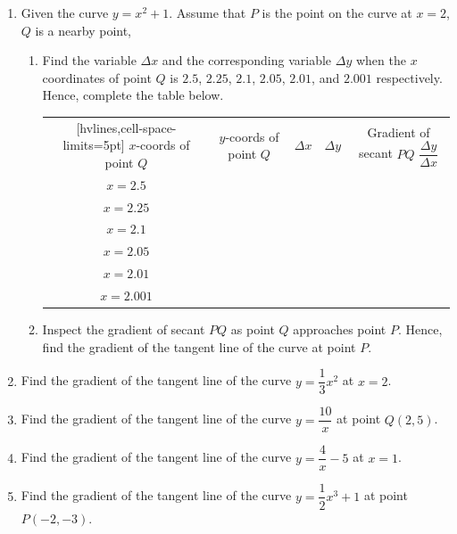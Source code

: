 \documentclass[12pt]{report}
\begin{document}
\begin{enumerate}
  \item Given the curve $y = x^2 + 1$. Assume that $P$ is the point on the curve at $x
          = 2$, $Q$ is a nearby point,
        \begin{enumerate}
          \item Find the variable $\Delta x$ and the corresponding variable $\Delta y$ when the
                $x$ coordinates of point $Q$ is $2.5$, $2.25$, $2.1$, $2.05$, $2.01$, and
                $2.001$ respectively. Hence, complete the table below.
                \begin{center}
                  \begin{NiceTabular}{|c|c|c|c|c|}[hvlines,cell-space-limits=5pt]
                    $x$-coords of point $Q$ & $y$-coords of point $Q$ & $\Delta x$ & $\Delta y$ & Gradient of secant $PQ$ $\dfrac{\Delta y}{\Delta x}$ \\
                    $x = 2.5$                    &                              &            &            &                              \\
                    $x = 2.25$                   &                              &            &            &                              \\
                    $x = 2.1$                    &                              &            &            &                              \\
                    $x = 2.05$                   &                              &            &            &                              \\
                    $x = 2.01$                   &                              &            &            &                              \\
                    $x = 2.001$                  &                              &            &            &                              \\
                  \end{NiceTabular}
                \end{center}

          \item Inspect the gradient of secant $PQ$ as point $Q$ approaches point $P$. Hence,
                find the gradient of the tangent line of the curve at point $P$.
        \end{enumerate}

  \item Find the gradient of the tangent line of the curve $y = \dfrac{1}{3}x^2$ at $x
          = 2$.
  \item Find the gradient of the tangent line of the curve $y = \dfrac{10}{x}$ at point
        $Q(2, 5)$.
  \item Find the gradient of the tangent line of the curve $y = \dfrac{4}{x} - 5$ at $x
          = 1$.
  \item Find the gradient of the tangent line of the curve $y = \dfrac{1}{2}x^3 + 1$ at
        point $P(-2, -3)$.
\end{enumerate}
\end{document}
